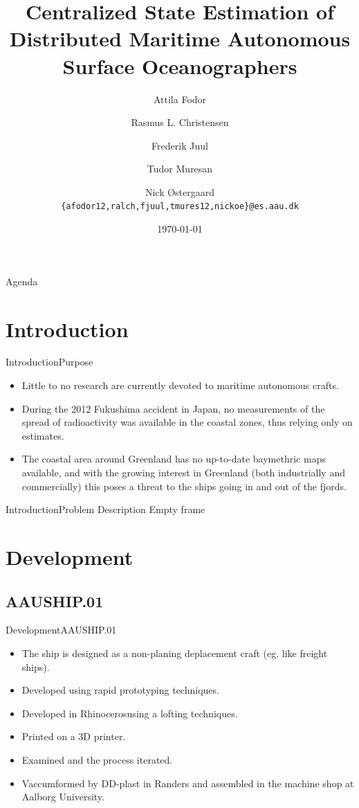 \documentclass[10pt]{beamer}
\title[Centralized State Estimation\\ of Distributed Maritime Autonomous Surface Oceanographers]%
{Centralized State Estimation of Distributed Maritime Autonomous Surface Oceanographers}
\author[12gr730]{%
  Attila Fodor \and Rasmus L. Christensen \and Frederik Juul \and Tudor Muresan \and Nick \O stergaard\\
  {{\tt \{afodor12,ralch,fjuul,tmures12,nickoe\}@es.aau.dk}}
}
\institute[
  Dept.\ of Electronic Systems,\\
  Aalborg University,\\
  Denmark
] %
{%
  Department of Electronic Systems,\\
  Aalborg University,\\
  Denmark
  
}
\date{\today}
\begin{document}
\begin{frame}[plain] %
  \titlepage
\end{frame}

\begin{frame}{Agenda}{}
\tableofcontents
\end{frame}
\section{Introduction}
\begin{frame}{Introduction}{Purpose}
  \begin{itemize}
  	\item<1-> Little to no research are currently devoted to maritime autonomous crafts.
    \item<2-> During the 2012 Fukushima accident in Japan, no measurements of the spread of radioactivity was available in the coastal zones, thus relying only on estimates. 
    \item<3-> The coastal area around Greenland has no up-to-date baymethric maps available, and with the growing interest in Greenland (both industrially and commercially) this poses a threat to the ships going in and out of the fjords.
  \end{itemize}
\end{frame}
\begin{frame}{Introduction}{Problem Description}
Empty frame
\end{frame}

\section{Development}
\subsection{AAUSHIP.01}
\begin{frame}{Development}{AAUSHIP.01}
\begin{itemize}
	\item<1-> The ship is designed as a non-planing deplacement craft (eg. like freight ships).
	\item<2-> Developed using rapid prototyping techniques.
	\item<3-> Developed in Rhinoceros\texttrademark using a lofting techniques.
	\item<4-> Printed on a 3D printer.
	\item<5-> Examined and the process iterated.
	\item<6-> Vaccumformed by DD-plast in Randers and assembled in the machine shop at Aalborg University.
\end{itemize}
\end{frame}
\end{document}
